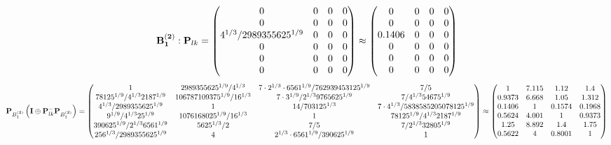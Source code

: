 \documentclass[10pt,a4paper]{article}
\begin{document}
	\[
		\bold{B_1^{(2)}}: \bold{P}_{lk} = 
		\begin{pmatrix}
			{{0}}{} & {{0}}{} & {{0}}{} & {{0}}{} \\
			{{0}}{} & {{0}}{} & {{0}}{} & {{0}}{} \\
			{{4^ {1 / 3}}} / {{2989355625^ {1 / 9}}} & {{0}}{} & {{0}}{} & {{0}}{} \\
			{{0}}{} & {{0}}{} & {{0}}{} & {{0}}{} \\
			{{0}}{} & {{0}}{} & {{0}}{} & {{0}}{} \\
			{{0}}{} & {{0}}{} & {{0}}{} & {{0}}{} \\
		\end{pmatrix}
		\approx
		\begin{pmatrix}
			0        & 0        & 0        & 0        \\
			0        & 0        & 0        & 0        \\
			0.1406   & 0        & 0        & 0        \\
			0        & 0        & 0        & 0        \\
			0        & 0        & 0        & 0        \\
			0        & 0        & 0        & 0        \\
		\end{pmatrix}
	\]
	\[
		\bold{P}_{B_1^{(2)}}\left(\bold{I} \oplus \bold{P}_{lk}^{-}\bold{P}_{B_1^{(2)}}\right) = 
		\begin{pmatrix}
			{1}{} & {{2989355625^ {1 / 9}}} / {{4^ {1 / 3}}} & {{7} \cdot {2^ {1 / 3}} \cdot {6561^ {1 / 9}}} / {{762939453125^ {1 / 9}}} & {{7}} / {{5}} \\
			{{78125^ {1 / 9}}} / {{4^ {1 / 3}}{2187^ {1 / 9}}} & {{106787109375^ {1 / 9}}} / {{16^ {1 / 3}}} & {{7} \cdot {3^ {1 / 9}}} / {{2^ {1 / 3}}{9765625^ {1 / 9}}} & {{7}} / {{4^ {1 / 3}}{54675^ {1 / 9}}} \\
			{{4^ {1 / 3}}} / {{2989355625^ {1 / 9}}} & {1}{} & {{14}} / {{703125^ {1 / 3}}} & {{7} \cdot {4^ {1 / 3}}} / {{5838585205078125^ {1 / 9}}} \\
			{{9^ {1 / 9}}} / {{4^ {1 / 3}}{25^ {1 / 9}}} & {{1076168025^ {1 / 9}}} / {{16^ {1 / 3}}} & {1}{} & {{78125^ {1 / 9}}} / {{4^ {1 / 3}}{2187^ {1 / 9}}} \\
			{{390625^ {1 / 9}}} / {{2^ {1 / 3}}{6561^ {1 / 9}}} & {{5625^ {1 / 3}}} / {{2}} & {{7}} / {{5}} & {{7}} / {{2^ {1 / 3}}{32805^ {1 / 9}}} \\
			{{256^ {1 / 3}}} / {{2989355625^ {1 / 9}}} & {{4}}{} & {{2^ {1 / 3}} \cdot {6561^ {1 / 9}}} / {{390625^ {1 / 9}}} & {1}{} \\
		\end{pmatrix}
		\approx
		\begin{pmatrix}
			1        & 7.115    & 1.12     & 1.4      \\
			0.9373   & 6.668    & 1.05     & 1.312    \\
			0.1406   & 1        & 0.1574   & 0.1968   \\
			0.5624   & 4.001    & 1        & 0.9373   \\
			1.25     & 8.892    & 1.4      & 1.75     \\
			0.5622   & 4        & 0.8001   & 1        \\
		\end{pmatrix}
	\]
\end{document}
